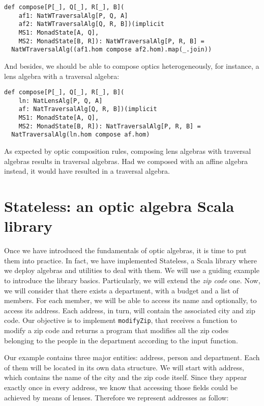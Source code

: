 \documentclass[final, twocolumn, 3p]{elsarticle}
\begin{document}
\begin{lstlisting}
def compose[P[_], Q[_], R[_], B](
    af1: NatWTraversalAlg[P, Q, A]
    af2: NatWTraversalAlg[Q, R, B])(implicit
    MS1: MonadState[A, Q],
    MS2: MonadState[B, R]): NatWTraversalAlg[P, R, B] =
  NatWTraversalAlg((af1.hom compose af2.hom).map(_.join))
\end{lstlisting}

And besides, we should be able to compose optics heterogeneously, for instance,
a lens algebra with a traversal algebra:

\begin{lstlisting}
def compose[P[_], Q[_], R[_], B](
    ln: NatLensAlg[P, Q, A]
    af: NatTraversalAlg[Q, R, B])(implicit
    MS1: MonadState[A, Q],
    MS2: MonadState[B, R]): NatTraversalAlg[P, R, B] =
  NatTraversalAlg(ln.hom compose af.hom)
\end{lstlisting}

As expected by optic composition rules, composing lens algebras with traversal
algebras results in traversal algebras. Had we composed with an affine algebra
instead, it would have resulted in a traversal algebra.

\section{Stateless: an optic algebra Scala library}
\label{sec:Stateless}

Once we have introduced the fundamentals of optic algebras, it is time to put
them into practice. In fact, we have implemented Stateless, a Scala library
where we deploy algebras and utilities to deal with them. We will use a guiding
example to introduce the library basics. Particularly, we will extend the
\emph{zip code} one. Now, we will consider that there exists a department, with
a budget and a list of members. For each member, we will be able to access its
name and optionally, to access its address. Each address, in turn, will contain
the associated city and zip code. Our objective is to implement
\lstinline{modifyZip}, that receives a function to modify a zip code and returns
a program that modifies all the zip codes belonging to the people in the
department according to the input function.

Our example contains three major entities: address, person and department. Each
of them will be located in its own data structure. We will start with address,
which contains the name of the city and the zip code itself. Since they appear
exactly once in every address, we know that accessing those fields could be
achieved by means of lenses. Therefore we represent addresses as follow:
\end{document}
